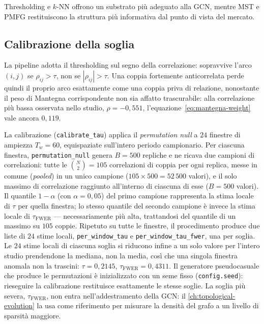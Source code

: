 Thresholding e $k$-NN offrono un substrato più adeguato alla GCN, mentre MST e PMFG restituiscono la struttura più informativa dal punto di vista del mercato.

\subsection{Calibrazione della soglia}
\label{sec:tau-calibration}

La pipeline adotta il thresholding sul segno della correlazione: sopravvive l'arco $(i,j)$ se $\rho_{ij}>\tau$, non se $|\rho_{ij}|>\tau$. Una coppia fortemente anticorrelata perde quindi il proprio arco esattamente come una coppia priva di relazione, nonostante il peso di Mantegna corrispondente non sia affatto trascurabile: alla correlazione più bassa osservata nello studio, $\rho=-0{,}551$, l'equazione~\eqref{eq:mantegna-weight} vale ancora $0{,}119$.

La calibrazione (\texttt{calibrate\_tau}) applica il \emph{permutation null} a $24$ finestre di ampiezza $T_w=60$, equispaziate sull'intero periodo campionario. Per ciascuna finestra, \texttt{permutation\_null} genera $B=500$ repliche e ne ricava due campioni di correlazioni: tutte le $\binom{N}{2}=105$ correlazioni di coppia per ogni replica, messe in comune (\emph{pooled}) in un unico campione ($105 \times 500 = 52\,500$ valori), e il solo massimo di correlazione raggiunto all'interno di ciascuna di esse ($B=500$ valori). Il quantile $1-\alpha$ (con $\alpha=0{,}05$) del primo campione rappresenta la stima locale di $\tau$ per quella finestra; lo stesso quantile del secondo campione è invece la stima locale di $\tau_{\mathrm{FWER}}$ — necessariamente più alta, trattandosi del quantile di un massimo su $105$ coppie. Ripetuto su tutte le finestre, il procedimento produce due liste di $24$ stime locali, \texttt{per\_window\_tau} e \texttt{per\_window\_tau\_fwer}, una per soglia. Le $24$ stime locali di ciascuna soglia si riducono infine a un solo valore per l'intero studio prendendone la mediana, non la media, così che una singola finestra anomala non la trascini: $\tau=0{,}2145$, $\tau_{\mathrm{FWER}}=0{,}4311$. Il generatore pseudocasuale che produce le permutazioni è inizializzato con un seme fisso (\texttt{config.seed}): rieseguire la calibrazione restituisce esattamente le stesse soglie. La soglia più severa, $\tau_{\mathrm{FWER}}$, non entra nell'addestramento della GCN: il \cref{ch:topological-evolution} la usa come riferimento per misurare la densità del grafo a un livello di sparsità maggiore.

